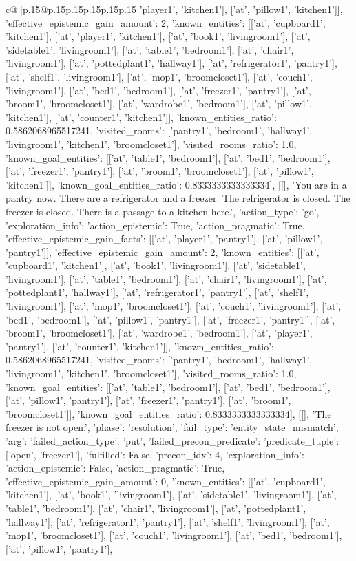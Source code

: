 \documentclass{article}
\begin{document}
{\begin{supertabular}{c@{$\;$}|p{.15\linewidth}@{}p{.15\linewidth}p{.15\linewidth}p{.15\linewidth}p{.15\linewidth}p{.15\linewidth}}
{{{'player1', 'kitchen1'], ['at', 'pillow1', 'kitchen1']], 'effective_epistemic_gain_amount': 2, 'known_entities': [['at', 'cupboard1', 'kitchen1'], ['at', 'player1', 'kitchen1'], ['at', 'book1', 'livingroom1'], ['at', 'sidetable1', 'livingroom1'], ['at', 'table1', 'bedroom1'], ['at', 'chair1', 'livingroom1'], ['at', 'pottedplant1', 'hallway1'], ['at', 'refrigerator1', 'pantry1'], ['at', 'shelf1', 'livingroom1'], ['at', 'mop1', 'broomcloset1'], ['at', 'couch1', 'livingroom1'], ['at', 'bed1', 'bedroom1'], ['at', 'freezer1', 'pantry1'], ['at', 'broom1', 'broomcloset1'], ['at', 'wardrobe1', 'bedroom1'], ['at', 'pillow1', 'kitchen1'], ['at', 'counter1', 'kitchen1']], 'known_entities_ratio': 0.5862068965517241, 'visited_rooms': ['pantry1', 'bedroom1', 'hallway1', 'livingroom1', 'kitchen1', 'broomcloset1'], 'visited_rooms_ratio': 1.0, 'known_goal_entities': [['at', 'table1', 'bedroom1'], ['at', 'bed1', 'bedroom1'], ['at', 'freezer1', 'pantry1'], ['at', 'broom1', 'broomcloset1'], ['at', 'pillow1', 'kitchen1']], 'known_goal_entities_ratio': 0.8333333333333334}}], [[], 'You are in a pantry now. There are a refrigerator and a freezer. The refrigerator is closed. The freezer is closed. There is a passage to a kitchen here.', {'action_type': 'go', 'exploration_info': {'action_epistemic': True, 'action_pragmatic': True, 'effective_epistemic_gain_facts': [['at', 'player1', 'pantry1'], ['at', 'pillow1', 'pantry1']], 'effective_epistemic_gain_amount': 2, 'known_entities': [['at', 'cupboard1', 'kitchen1'], ['at', 'book1', 'livingroom1'], ['at', 'sidetable1', 'livingroom1'], ['at', 'table1', 'bedroom1'], ['at', 'chair1', 'livingroom1'], ['at', 'pottedplant1', 'hallway1'], ['at', 'refrigerator1', 'pantry1'], ['at', 'shelf1', 'livingroom1'], ['at', 'mop1', 'broomcloset1'], ['at', 'couch1', 'livingroom1'], ['at', 'bed1', 'bedroom1'], ['at', 'pillow1', 'pantry1'], ['at', 'freezer1', 'pantry1'], ['at', 'broom1', 'broomcloset1'], ['at', 'wardrobe1', 'bedroom1'], ['at', 'player1', 'pantry1'], ['at', 'counter1', 'kitchen1']], 'known_entities_ratio': 0.5862068965517241, 'visited_rooms': ['pantry1', 'bedroom1', 'hallway1', 'livingroom1', 'kitchen1', 'broomcloset1'], 'visited_rooms_ratio': 1.0, 'known_goal_entities': [['at', 'table1', 'bedroom1'], ['at', 'bed1', 'bedroom1'], ['at', 'pillow1', 'pantry1'], ['at', 'freezer1', 'pantry1'], ['at', 'broom1', 'broomcloset1']], 'known_goal_entities_ratio': 0.8333333333333334}}], [[], 'The freezer is not open.', {'phase': 'resolution', 'fail_type': 'entity_state_mismatch', 'arg': {'failed_action_type': 'put', 'failed_precon_predicate': {'predicate_tuple': ['open', 'freezer1'], 'fulfilled': False, 'precon_idx': 4}}, 'exploration_info': {'action_epistemic': False, 'action_pragmatic': True, 'effective_epistemic_gain_amount': 0, 'known_entities': [['at', 'cupboard1', 'kitchen1'], ['at', 'book1', 'livingroom1'], ['at', 'sidetable1', 'livingroom1'], ['at', 'table1', 'bedroom1'], ['at', 'chair1', 'livingroom1'], ['at', 'pottedplant1', 'hallway1'], ['at', 'refrigerator1', 'pantry1'], ['at', 'shelf1', 'livingroom1'], ['at', 'mop1', 'broomcloset1'], ['at', 'couch1', 'livingroom1'], ['at', 'bed1', 'bedroom1'], ['at', 'pillow1', 'pantry1'], }}}
\end{supertabular}}
\end{document}
